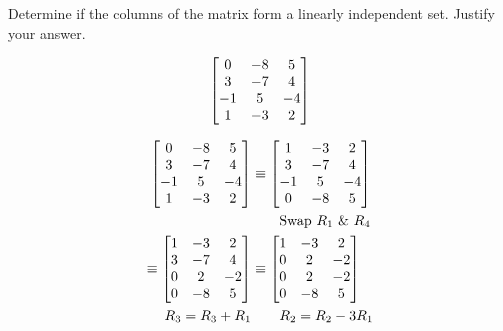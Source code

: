\documentclass{../mathhomework}
\newenvironment{Mat}{\begin{bmatrix}}{\end{bmatrix}}
\begin{document}
\begin{problem}[1.7\#5]
    Determine if the columns of the matrix form a linearly independent set. Justify your answer.

    \begin{equation*}
        \begin{Mat}
            0 & -8 & 5 \\
            3 & -7 & 4 \\
            -1 & 5 & -4 \\
            1 & -3 & 2
        \end{Mat}
    \end{equation*}

    \begin{solution}
        \begin{align*}
            \begin{Mat}
                0 & -8 & 5 \\
                3 & -7 & 4 \\
                -1 & 5 & -4 \\
                1 & -3 & 2
            \end{Mat}
            & \equiv \begin{Mat}
                1 & -3 & 2 \\ 
                3 & -7 & 4 \\
                -1 & 5 & -4 \\
                0 & -8 & 5
            \end{Mat}
            \\ 
            & \qquad{} \text{Swap $R_1$ \& $R_4$} \\
            \equiv \begin{Mat}
                1 & -3 & 2 \\ 
                3 & -7 & 4 \\
                0 & 2 & -2 \\
                0 & -8 & 5
            \end{Mat}
            & \equiv \begin{Mat}
                1 & -3 & 2 \\ 
                0 & 2 & -2 \\
                0 & 2 & -2 \\
                0 & -8 & 5
            \end{Mat}
            \\ 
            R_3 = R_3 + R_1 & \qquad{} R_2 = R_2 - 3R_1 \\

\end{align*}
\end{solution}
\end{problem}
\end{document}
